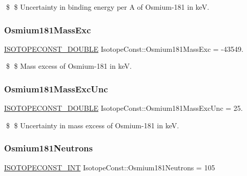 \$ \$ Uncertainty in binding energy per A of Osmium-\/181 in keV. \mbox{\label{group___isotope_const-_osmium-_os181_ga8f523f9841acae70acc2a4ecb8f77329}} 
\subsubsection{\texorpdfstring{Osmium181\+Mass\+Exc}{Osmium181MassExc}}
{\footnotesize\ttfamily \mbox{\hyperlink{group___isotope_const-_macros_ga8f45a7272ce02c0b4c65c44636ed719a}{I\+S\+O\+T\+O\+P\+E\+C\+O\+N\+S\+T\+\_\+\+D\+O\+U\+B\+LE}} Isotope\+Const\+::\+Osmium181\+Mass\+Exc = -\/43549.}

\$ \$ Mass excess of Osmium-\/181 in keV. \mbox{\label{group___isotope_const-_osmium-_os181_gaacdc9a4d28dbe881d82ef3d01c14ed80}} 
\subsubsection{\texorpdfstring{Osmium181\+Mass\+Exc\+Unc}{Osmium181MassExcUnc}}
{\footnotesize\ttfamily \mbox{\hyperlink{group___isotope_const-_macros_ga8f45a7272ce02c0b4c65c44636ed719a}{I\+S\+O\+T\+O\+P\+E\+C\+O\+N\+S\+T\+\_\+\+D\+O\+U\+B\+LE}} Isotope\+Const\+::\+Osmium181\+Mass\+Exc\+Unc = 25.}

\$ \$ Uncertainty in mass excess of Osmium-\/181 in keV. \mbox{\label{group___isotope_const-_osmium-_os181_ga19d6cdd5c422483723eb8c6aab62e3e2}} 
\subsubsection{\texorpdfstring{Osmium181\+Neutrons}{Osmium181Neutrons}}
{\footnotesize\ttfamily \mbox{\hyperlink{group___isotope_const-_macros_ga5f18360b3e99483a35c32d789e62621c}{I\+S\+O\+T\+O\+P\+E\+C\+O\+N\+S\+T\+\_\+\+I\+NT}} Isotope\+Const\+::\+Osmium181\+Neutrons = 105}

